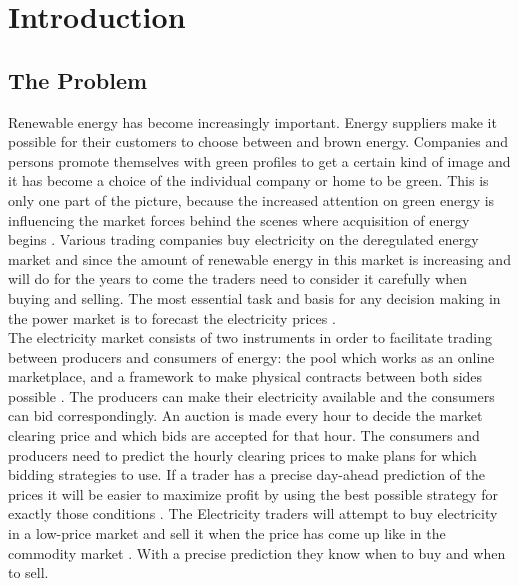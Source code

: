 \documentclass[twoside,11pt,openright]{report}
\begin{document}

\chapter{Introduction}
\label{ch:intro}
\section{The Problem}
Renewable energy has become increasingly important. Energy suppliers make it possible for their customers to choose between and brown energy. Companies and persons promote themselves with green profiles to get a certain kind of image and it has become a choice of the individual company or home to be green. This is only one part of the picture, because the increased attention on green energy is influencing the market forces behind the scenes where acquisition of energy begins \cite{windPowerDanishLiberalized}. Various trading companies buy electricity on the deregulated energy market and since the amount of renewable energy in this market is increasing and will do for the years to come\cite{6, windPowerDanishLiberalized} the traders need to consider it carefully when buying and selling. The most essential task and basis for any decision making in the power market is to forecast the electricity prices \cite{pjmForecast}.
\\[0.5cm]
The electricity market consists of two instruments in order to facilitate trading between producers and consumers of energy: the pool which works as an online marketplace, and a framework to make physical contracts between both sides possible \cite{21}. The producers can make their electricity available and the consumers can bid correspondingly. An auction is made every hour to decide the market clearing price and which bids are accepted for that hour. The consumers and producers need to predict the hourly clearing prices to make plans for which bidding strategies to use. If a trader has a precise day-ahead prediction of the prices it will be easier to maximize profit by using the best possible strategy for exactly those conditions \cite{21}. The Electricity traders will attempt to buy electricity in a low-price market and sell it when the price has come up like in
the commodity market \cite{FIND REF}. With a precise prediction they know when to buy and when to sell. 
\end{document}
